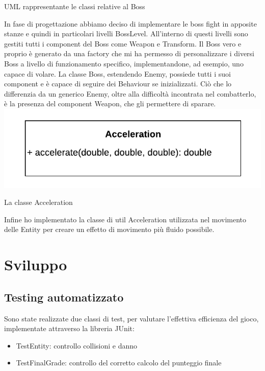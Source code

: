\documentclass{article}
\begin{document}
    \caption{UML rappresentante le classi relative al Boss}
    \label{fig:schgen}
In fase di progettazione abbiamo deciso di implementare le boss fight in apposite stanze e quindi in particolari livelli BossLevel. All’interno di questi livelli sono gestiti tutti i component del Boss come Weapon e Transform.
Il Boss vero e proprio è generato da una factory che mi ha permesso di personalizzare i diversi Boss a livello di funzionamento specifico, implementandone, ad esempio, uno capace di volare.
La classe Boss, estendendo Enemy, possiede tutti i suoi component e è capace di seguire dei Behaviour se inizializzati. Ciò che lo differenzia da un generico Enemy, oltre alla difficoltà incontrata nel combatterlo, è la presenza del component Weapon, che gli permettere di sparare.
\includegraphics[width=1\textwidth]{UMLAcceleration.png}
    \caption{La classe Acceleration}
    \label{fig:schgen}
Infine ho implementato la classe di util Acceleration utilizzata nel movimento delle Entity per creare un effetto di movimento più fluido possibile.
\section{Sviluppo}
\subsection{Testing automatizzato}
Sono state realizzate due classi di test, per valutare l'effettiva efficienza del gioco, implementate attraverso la libreria JUnit:
\begin{itemize}
    \item TestEntity: controllo collisioni e danno
    \item TestFinalGrade: controllo del corretto calcolo del punteggio finale
\end{itemize}
\end{document}

